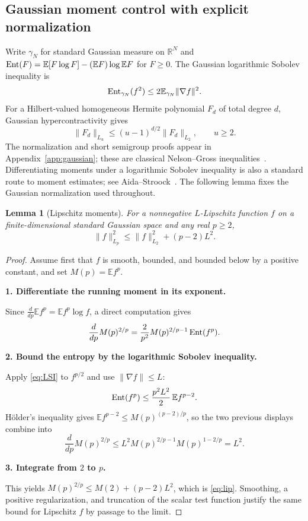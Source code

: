 \documentclass[11pt]{article}
\numberwithin{equation}{section}
\newtheorem{lemma}[theorem]{Lemma}
\theoremstyle{definition}\newtheorem{definition}[theorem]{Definition}
\theoremstyle{remark}\newtheorem{remark}[theorem]{Remark}
\newcommand{\R}{\mathbb R}\newcommand{\E}{\mathbb E}\newcommand{\Prob}{\mathbb P}
\newcommand{\norm}[1]{\lVert#1\rVert}\newcommand{\ip}[2]{\langle#1,#2\rangle}
\newcommand{\step}[1]{\par\addvspace{.65\baselineskip}\Needspace{4\baselineskip}\noindent\textbf{#1}\par\nobreak\smallskip}
\begin{document}
\subsection{Gaussian moment control with explicit normalization}
Write $\gamma_N$ for standard Gaussian measure on $\R^N$ and
$\Ent(F)=\E[F\log F]-(\E F)\log\E F$ for $F\ge0$.
The Gaussian logarithmic Sobolev inequality is
\begin{equation}\label{eq:LSI}
 \Ent_{\gamma_N}(f^2)\le2\E_{\gamma_N}\norm{\nabla f}^2.
\end{equation}
For a Hilbert-valued homogeneous Hermite polynomial $F_d$ of total degree $d$,
Gaussian hypercontractivity gives
\begin{equation}\label{eq:HC}
 \norm{F_d}_{L_u}\le(u-1)^{d/2}\norm{F_d}_{L_2},\qquad u\ge2.
\end{equation}
The normalization and short semigroup proofs appear in Appendix~\ref{app:gaussian};
these are classical Nelson--Gross inequalities~\cite{Nelson,Gross,GrossSurvey}.
Differentiating moments under a logarithmic Sobolev inequality is also a standard
route to moment estimates; see Aida--Stroock~\cite{AidaStroock}.
The following lemma fixes the Gaussian normalization used throughout.

\begin{lemma}[Lipschitz moments]\label{lem:lip}
For a nonnegative $L$-Lipschitz function $f$ on a finite-dimensional standard
Gaussian space and any real $p\ge2$,
\begin{equation}\label{eq:lip}
 \norm f_{L_p}^2\le\norm f_{L_2}^2+(p-2)L^2.
\end{equation}
\end{lemma}
\begin{proof}
Assume first that $f$ is smooth, bounded, and bounded below by a positive
constant, and set $M(p)=\E f^p$.

\step{1. Differentiate the running moment in its exponent.}
Since $\frac{d}{dp}\E f^p=\E f^p\log f$, a direct computation gives
\[
 \frac{d}{dp}M(p)^{2/p}
 =\frac2{p^2}M(p)^{2/p-1}\operatorname{Ent}(f^p).
\]

\step{2. Bound the entropy by the logarithmic Sobolev inequality.}
Apply \eqref{eq:LSI} to $f^{p/2}$ and use $\norm{\nabla f}\le L$:
\[
 \Ent(f^p)\le\frac{p^2L^2}2\,\E f^{p-2}.
\]
H\"older's inequality gives $\E f^{p-2}\le M(p)^{(p-2)/p}$, so the two previous
displays combine into
\[
 \frac{d}{dp}M(p)^{2/p}
 \le L^2M(p)^{2/p-1}M(p)^{1-2/p}=L^2.
\]

\step{3. Integrate from $2$ to $p$.}
This yields $M(p)^{2/p}\le M(2)+(p-2)L^2$, which is \eqref{eq:lip}.
Smoothing, a positive regularization, and truncation of the scalar test function
justify the same bound for Lipschitz $f$ by passage to the limit.
\end{proof}
\end{document}
